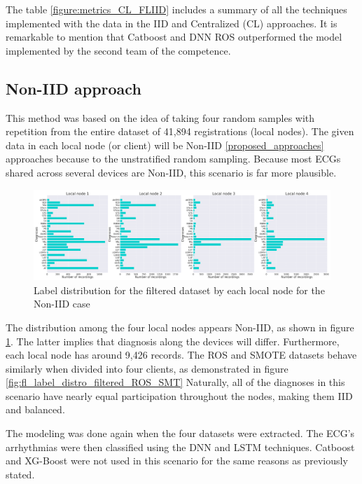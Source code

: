 The table \ref{figure:metrics_CL_FLIID} includes a summary of all the techniques implemented with the data in the IID and Centralized (CL) approaches. It is remarkable to mention that Catboost and DNN ROS outperformed the model implemented by the second team of the competence.

\subsection{Non-IID approach}

This method was based on the idea of taking four random samples with repetition from the entire dataset of 41,894 registrations (local nodes). The given data in each local node (or client) will be Non-IID \ref{proposed_approaches} approaches because to the unstratified random sampling. Because most ECGs shared across several devices are Non-IID, this scenario is far more plausible.

\begin{figure}[H]
\centering
\includegraphics[scale=0.4]{img/fl_label_distro_filtered_noniid.png}
\caption{Label distribution for the filtered dataset by each local node for the Non-IID case}
\label{fig:fl_label_distro_filtered_noniid}
\end{figure}

The distribution among the four local nodes appears Non-IID, as shown in figure \ref{fig:fl_label_distro_filtered_noniid}. The latter implies that diagnosis along the devices will differ. Furthermore, each local node has around 9,426 records. The ROS and SMOTE datasets behave similarly when divided into four clients, as demonstrated in figure \ref{fig:fl_label_distro_filtered_ROS_SMT} Naturally, all of the diagnoses in this scenario have nearly equal participation throughout the nodes, making them IID and balanced.

The modeling was done again when the four datasets were extracted. The ECG's arrhythmias were then classified using the DNN and LSTM techniques. Catboost and XG-Boost were not used in this scenario for the same reasons as previously stated.

